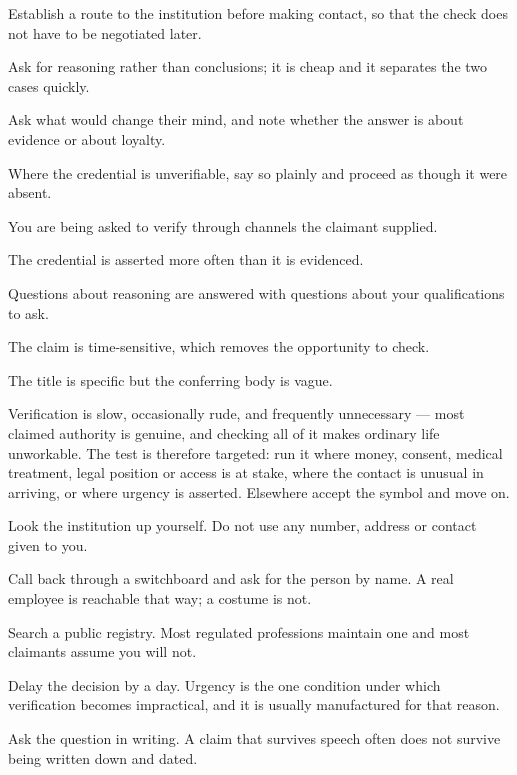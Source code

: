 \begin{application}
  \item Establish a route to the institution before making contact, so that the check does not have to be negotiated later.
  \item Ask for reasoning rather than conclusions; it is cheap and it separates the two cases quickly.
  \item Ask what would change their mind, and note whether the answer is about evidence or about loyalty.
  \item Where the credential is unverifiable, say so plainly and proceed as though it were absent.
\end{application}

\begin{feedback}
  \item You are being asked to verify through channels the claimant supplied.
  \item The credential is asserted more often than it is evidenced.
  \item Questions about reasoning are answered with questions about your qualifications to ask.
  \item The claim is time-sensitive, which removes the opportunity to check.
  \item The title is specific but the conferring body is vague.
\end{feedback}

\begin{failure}
Verification is slow, occasionally rude, and frequently unnecessary --- most claimed authority is genuine, and checking all of it makes ordinary life unworkable. The test is therefore targeted: run it where money, consent, medical treatment, legal position or access is at stake, where the contact is unusual in arriving, or where urgency is asserted. Elsewhere accept the symbol and move on.
\end{failure}

\begin{countermeasures}
  \item Look the institution up yourself. Do not use any number, address or contact given to you.
  \item Call back through a switchboard and ask for the person by name. A real employee is reachable that way; a costume is not.
  \item Search a public registry. Most regulated professions maintain one and most claimants assume you will not.
  \item Delay the decision by a day. Urgency is the one condition under which verification becomes impractical, and it is usually manufactured for that reason.
  \item Ask the question in writing. A claim that survives speech often does not survive being written down and dated.
\end{countermeasures}

\seesources
{}

